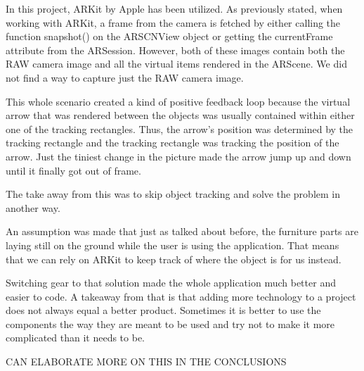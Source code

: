 In this project, ARKit by Apple has been utilized. As previously stated, when working with ARKit, a frame from the camera is fetched by either calling the function snapshot() on the ARSCNView object or getting the currentFrame attribute from the ARSession.
However, both of these images contain both the RAW camera image and all the virtual items rendered in the ARScene. We did not find a way to capture just the RAW camera image.

This whole scenario created a kind of positive feedback loop because the virtual arrow that was rendered between the objects was usually contained within either one of the tracking rectangles. Thus, the arrow's position was determined by the tracking rectangle and the tracking rectangle was tracking the position of the arrow.
Just the tiniest change in the picture made the arrow jump up and down until it finally got out of frame.

The take away from this was to skip object tracking and solve the problem in another way.

An assumption was made that just as talked about before, the furniture parts are laying still on the ground while the user is using the application. That means that we can rely on ARKit to keep track of where the object is for us instead.

Switching gear to that solution made the whole application much better and easier to code. A takeaway from that is that adding more technology to a project does not always equal a better product. Sometimes it is better to use the components the way they are meant to be used and try not to make it more complicated than it needs to be.

CAN ELABORATE MORE ON THIS IN THE CONCLUSIONS

\newpage